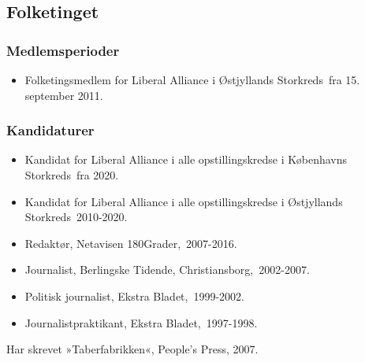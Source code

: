 \documentclass[11pt, a4paper]{awesome-cv}
\begin{document}
\begin{cvletter}
\subsection*{Folketinget}
\subsubsection*{Medlemsperioder}
\begin{itemize}
\item Folketingsmedlem for Liberal Alliance i Østjyllands Storkreds fra 15. september 2011.
\end{itemize}
\subsubsection*{Kandidaturer}
\begin{itemize}
\item Kandidat for Liberal Alliance i alle opstillingskredse i Københavns Storkreds fra 2020.
\item Kandidat for Liberal Alliance i alle opstillingskredse i Østjyllands Storkreds 2010-2020.
\end{itemize}
\begin{itemize}
\item Redaktør, Netavisen 180Grader, 2007-2016.
\item Journalist, Berlingske Tidende, Christiansborg, 2002-2007.
\item Politisk journalist, Ekstra Bladet, 1999-2002.
\item Journalistpraktikant, Ekstra Bladet, 1997-1998.
\end{itemize}
Har skrevet »Taberfabrikken«, People’s Press, 2007.

\end{cvletter}
\end{document}
